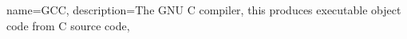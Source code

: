 {
name={GCC},
description={The GNU C compiler, this produces executable object code from C source code},
}
